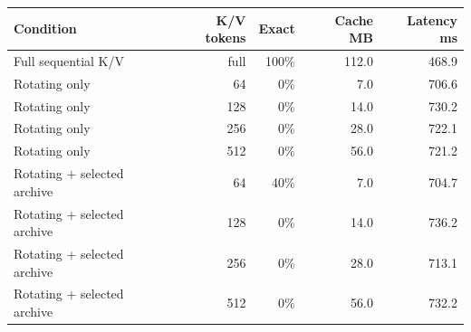 \begin{tabular}{lrrrr}
\toprule
Condition & K/V tokens & Exact & Cache MB & Latency ms \\
\midrule
Full sequential K/V & full & 100\% & 112.0 & 468.9 \\
Rotating only & 64 & 0\% & 7.0 & 706.6 \\
Rotating only & 128 & 0\% & 14.0 & 730.2 \\
Rotating only & 256 & 0\% & 28.0 & 722.1 \\
Rotating only & 512 & 0\% & 56.0 & 721.2 \\
Rotating + selected archive & 64 & 40\% & 7.0 & 704.7 \\
Rotating + selected archive & 128 & 0\% & 14.0 & 736.2 \\
Rotating + selected archive & 256 & 0\% & 28.0 & 713.1 \\
Rotating + selected archive & 512 & 0\% & 56.0 & 732.2 \\
\bottomrule
\end{tabular}

